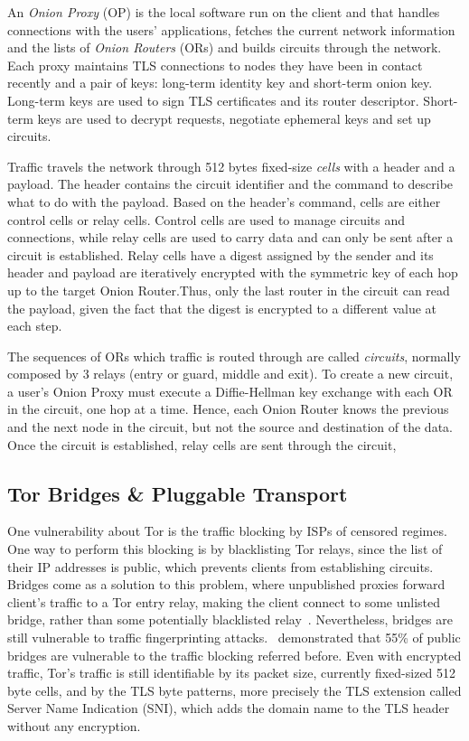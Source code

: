 An \textit{Onion Proxy} (OP) is the local software run on the client and that handles connections with the users' applications, fetches the current network information and the lists of \textit{Onion Routers} (ORs) and builds circuits through the network. Each proxy maintains TLS connections to nodes they have been in contact recently and a pair of keys: long-term identity key and short-term onion key. Long-term keys are used to sign TLS certificates and its router descriptor. Short-term keys are used to decrypt requests, negotiate ephemeral keys and set up circuits.

Traffic travels the network through 512 bytes fixed-size \textit{cells} with a header and a payload. The header contains the circuit identifier and the command to describe what to do with the payload. Based on the header's command, cells are either control cells or relay cells. Control cells are used to manage circuits and connections, while relay cells are used to carry data and can only be sent after a circuit is established. Relay cells have a digest assigned by the sender and its header and payload are iteratively encrypted with the symmetric key of each hop up to the target Onion Router.\@ Thus, only the last router in the circuit can read the payload, given the fact that the digest is encrypted to a different value at each step.

The sequences of ORs which traffic is routed through are called \textit{circuits}, normally composed by 3 relays (entry or guard, middle and exit).
To create a new circuit, a user's Onion Proxy must execute a Diffie-Hellman key exchange with each OR in the circuit, one hop at a time. Hence, each Onion Router knows the previous and the next node in the circuit, but not the source and destination of the data. Once the circuit is established, relay cells are sent through the circuit, 

\subsection{Tor Bridges \& Pluggable Transport}\label{subsec:tor_bridges}

One vulnerability about Tor is the traffic blocking by ISPs of censored regimes. One way to perform this blocking is by blacklisting Tor relays, since the list of their IP addresses is public, which prevents clients from establishing circuits. Bridges come as a solution to this problem, where unpublished proxies forward client's traffic to a Tor entry relay, making the client connect to some unlisted bridge, rather than some potentially blacklisted relay~\cite{Matic2017DissectingTB}.
Nevertheless, bridges are still vulnerable to traffic fingerprinting attacks.~\citeauthor{Matic2017DissectingTB} demonstrated that 55\% of public bridges are vulnerable to the traffic blocking referred before. Even with encrypted traffic, Tor's traffic is still identifiable by its packet size, currently fixed-sized 512 byte cells, and by the TLS byte patterns, more precisely the TLS extension called Server Name Indication (SNI), which adds the domain name to the TLS header without any encryption.

